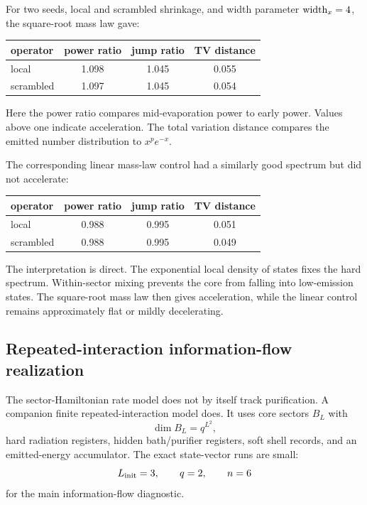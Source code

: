 \documentclass[aps,prd,onecolumn,longbibliography,nofootinbib]{revtex4-2}
\begin{document}
For two seeds, local and scrambled shrinkage, and width parameter
${\rm width}_x=4$, the square-root mass law gave:
\begin{center}
\begin{tabular}{lccc}
\toprule
operator & power ratio & jump ratio & TV distance\\
\midrule
local     & 1.098 & 1.045 & 0.055\\
scrambled & 1.097 & 1.045 & 0.054\\
\bottomrule
\end{tabular}
\end{center}
Here the power ratio compares mid-evaporation power to early power.  Values
above one indicate acceleration.  The total variation distance compares the
emitted number distribution to $x^p e^{-x}$.

The corresponding linear mass-law control had a similarly good spectrum but
did not accelerate:
\begin{center}
\begin{tabular}{lccc}
\toprule
operator & power ratio & jump ratio & TV distance\\
\midrule
local     & 0.988 & 0.995 & 0.051\\
scrambled & 0.988 & 0.995 & 0.049\\
\bottomrule
\end{tabular}
\end{center}

The interpretation is direct.  The exponential local density of states fixes
the hard spectrum.  Within-sector mixing prevents the core from falling into
low-emission states.  The square-root mass law then gives acceleration, while
the linear control remains approximately flat or mildly decelerating.

\subsection{Repeated-interaction information-flow realization}

The sector-Hamiltonian rate model does not by itself track purification.  A
companion finite repeated-interaction model does.  It uses core sectors
$B_L$ with
\begin{equation}
    \dim B_L=q^{L^2},
\end{equation}
hard radiation registers, hidden bath/purifier registers, soft shell records,
and an emitted-energy accumulator.  The exact state-vector runs are small:
\begin{equation}
    L_{\rm init}=3,\qquad q=2,\qquad n=6
\end{equation}
for the main information-flow diagnostic.
\end{document}
